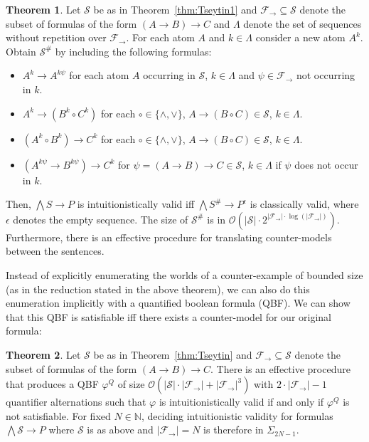 \documentclass[a4paper,11pt]{report}
\theoremstyle{definition}
\newtheorem{theorem}{Theorem}[section]
\theoremstyle{definition}
\theoremstyle{definition}
\theoremstyle{definition}
\theoremstyle{definition}
\theoremstyle{definition}
\theoremstyle{definition}
\begin{document}
	\begin{theorem}
		\label{thm:reduction-propositional}
		Let $\mathcal S$ be as in Theorem~\ref{thm:Tseytin1} and $\mathcal F_\to\subseteq\mathcal S$ denote the subset of formulas of the form $(A\to B)\to C$ and $\Lambda$ denote the set of sequences without repetition over $\mathcal F_\to$. For each atom $A$ and $k\in\Lambda$ consider a new atom $A^k$. Obtain $\mathcal S^\#$ by including the following formulas:
		\begin{itemize}
			\item $A^k\to A^{k\psi}$ for each atom $A$ occurring in $\mathcal S$, $k\in\Lambda$ and $\psi\in\mathcal F_\to$ not occurring in $k$.
			\item $A^k\to (B^k\circ C^k)$ for each $\circ\in\{\wedge,\vee\}$, $A\to (B\circ C)\in\mathcal S$, $k\in\Lambda$.
			\item $(A^k\circ B^k)\to C^k$ for each $\circ\in\{\wedge,\vee\}$, $A\to (B\circ C)\in\mathcal S$, $k\in\Lambda$.
			\item $(A^{k\psi}\to B^{k\psi})\to C^k$ for $\psi = (A\to B)\to C\in\mathcal S$, $k\in\Lambda$ if $\psi$ does not occur in $k$.
		\end{itemize}
		Then, $\bigwedge S\to P$ is intuitionistically valid iff $\bigwedge S^\#\to P^\epsilon$ is classically valid, where $\epsilon$ denotes the empty sequence. The size of $\mathcal S^\#$ is in $\mathcal O(|\mathcal S|\cdot2^{|\mathcal F_\to|\cdot\log(|\mathcal F_\to|)})$. Furthermore, there is an effective procedure for translating counter-models between the sentences.
	\end{theorem}
	
	Instead of explicitly enumerating the worlds of a counter-example of bounded size (as in the reduction stated in the above theorem), we can also do this enumeration implicitly with a quantified boolean formula (QBF).
	We can show that this QBF is satisfiable iff there exists a counter-model for our original formula:
	
	\begin{theorem}
		Let $\mathcal S$ be as in Theorem~\ref{thm:Tseytin} and $\mathcal F_\to\subseteq\mathcal S$ denote the subset of formulas of the form $(A\to B)\to C$. There is an effective procedure that produces a QBF $\varphi^Q$ of size $\mathcal O(|\mathcal S|\cdot|\mathcal F_\to| + |\mathcal F_\to|^3)$ with $2\cdot |\mathcal F_\to|-1$ quantifier alternations such that $\varphi$ is intuitionistically valid if and only if $\varphi^Q$ is not satisfiable. For fixed $N\in\mathbb N$, deciding intuitionistic validity for formulas $\bigwedge \mathcal S\to P$ where $\mathcal S$ is as above and $|\mathcal F_\to| = N$ is therefore in $\Sigma_{2N-1}$.
	\end{theorem}
	
\end{document}
